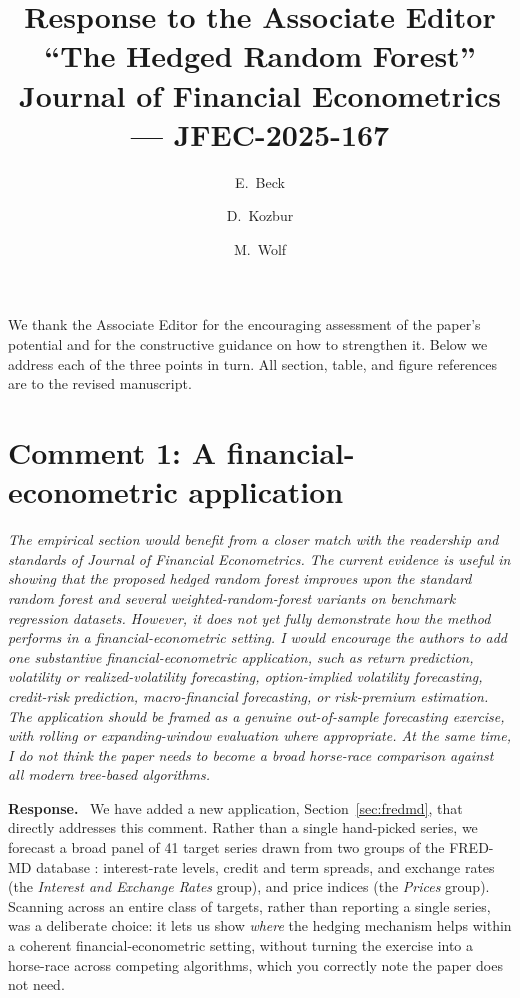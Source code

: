 \documentclass[12pt]{article}
\title{Response to the Associate Editor\\[6pt]
  \large ``The Hedged Random Forest''\\
  \normalsize Journal of Financial Econometrics --- JFEC-2025-167}
\author{E.\ Beck \and D.\ Kozbur \and M.\ Wolf}
\date{}
\newcommand{\comment}[1]{\begin{refbox}\itshape #1\end{refbox}}
\newcommand{\response}{\medskip\noindent\textbf{Response.}\ }
\begin{document}
\maketitle
\thispagestyle{empty}

We thank the Associate Editor for the encouraging assessment of the paper's
potential and for the constructive guidance on how to strengthen it. Below we
address each of the three points in turn. All section, table, and figure
references are to the revised manuscript.

\section*{Comment 1: A financial-econometric application}

\comment{The empirical section would benefit from a closer match with the
readership and standards of Journal of Financial Econometrics. The current
evidence is useful in showing that the proposed hedged random forest improves
upon the standard random forest and several weighted-random-forest variants
on benchmark regression datasets. However, it does not yet fully demonstrate
how the method performs in a financial-econometric setting. I would
encourage the authors to add one substantive financial-econometric
application, such as return prediction, volatility or realized-volatility
forecasting, option-implied volatility forecasting, credit-risk prediction,
macro-financial forecasting, or risk-premium estimation. The application
should be framed as a genuine out-of-sample forecasting exercise, with
rolling or expanding-window evaluation where appropriate. At the same time,
I do not think the paper needs to become a broad horse-race comparison
against all modern tree-based algorithms.}

\response
We have added a new application, Section~\ref{sec:fredmd}, that directly
addresses this comment. Rather than a single hand-picked series, we forecast
a broad panel of 41 target series drawn from two groups of the FRED-MD
database \citep{mccracken:ng:2016}: interest-rate levels, credit and term
spreads, and exchange rates (the \emph{Interest and Exchange Rates} group),
and price indices (the \emph{Prices} group). Scanning across an entire class
of targets, rather than reporting a single series, was a deliberate choice:
it lets us show \emph{where} the hedging mechanism helps within a coherent
financial-econometric setting, without turning the exercise into a
horse-race across competing algorithms, which you correctly note the paper
does not need.
\end{document}
